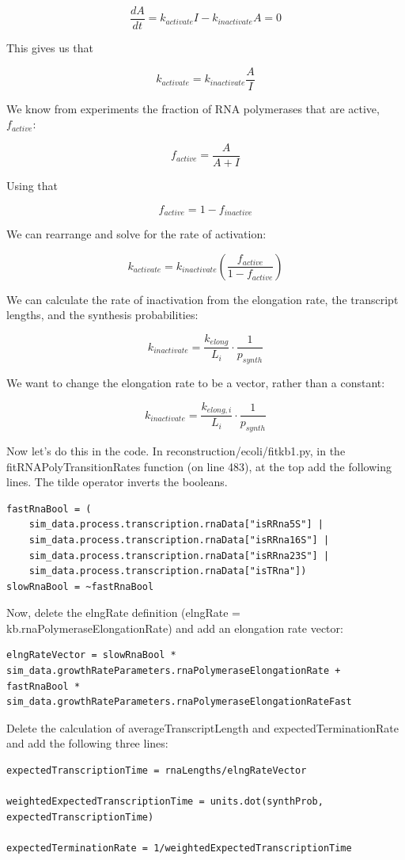 \documentclass[12pt]{article}
\begin{document}
$$
\frac{dA}{dt}=k_{activate}I - k_{inactivate}A=0
$$

This gives us that

$$
k_{activate} = k_{inactivate}\frac{A}{I}
$$


We know from experiments the fraction of RNA polymerases that are active, $f_{active}$:

$$
f_{active}=\frac{A}{A+I}
$$

Using that 

$$
f_{active} = 1 - f_{inactive}
$$

We can rearrange and solve for the rate of activation:

$$
k_{activate}=k_{inactivate}\left(\frac{f_{active}}{1-f_{active}} \right)
$$

We can calculate the rate of inactivation from the elongation rate, the transcript lengths, and the synthesis probabilities:

$$
k_{inactivate}=\frac{k_{elong}}{L_i}\cdot\frac{1}{p_{synth}}
$$

We want to change the elongation rate to be a vector, rather than a constant:

$$
k_{inactivate}=\frac{k_{elong,i}}{L_i}\cdot \frac{1}{p_{synth}}
$$

Now let’s do this in the code. In reconstruction/ecoli/fitkb1.py, in the fitRNAPolyTransitionRates function (on line 483), at the top add the following lines. The tilde operator inverts the booleans.

\begin{lstlisting}
fastRnaBool = (
    sim_data.process.transcription.rnaData["isRRna5S"] |
    sim_data.process.transcription.rnaData["isRRna16S"] |
    sim_data.process.transcription.rnaData["isRRna23S"] |
    sim_data.process.transcription.rnaData["isTRna"])
slowRnaBool = ~fastRnaBool
\end{lstlisting}

Now, delete the elngRate definition (elngRate = kb.rnaPolymeraseElongationRate) and add an elongation rate vector:

\begin{lstlisting}
elngRateVector = slowRnaBool * sim_data.growthRateParameters.rnaPolymeraseElongationRate + fastRnaBool * sim_data.growthRateParameters.rnaPolymeraseElongationRateFast
\end{lstlisting}

Delete the calculation of averageTranscriptLength and expectedTerminationRate and add the following three lines:

\begin{lstlisting}
expectedTranscriptionTime = rnaLengths/elngRateVector

weightedExpectedTranscriptionTime = units.dot(synthProb, expectedTranscriptionTime)

expectedTerminationRate = 1/weightedExpectedTranscriptionTime
\end{lstlisting}
\end{document}
